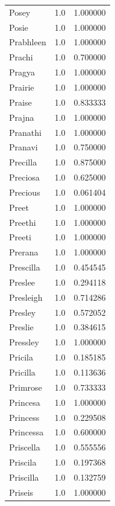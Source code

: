 \documentclass[
  letterpaper,
  DIV=11,
  numbers=noendperiod]{scrreprt}
\begin{document}
\begin{tabular}{lrr}
Posey           &   1.0 &   1.000000 \\
Posie           &   1.0 &   1.000000 \\
Prabhleen       &   1.0 &   1.000000 \\
Prachi          &   1.0 &   0.700000 \\
Pragya          &   1.0 &   1.000000 \\
Prairie         &   1.0 &   1.000000 \\
Praise          &   1.0 &   0.833333 \\
Prajna          &   1.0 &   1.000000 \\
Pranathi        &   1.0 &   1.000000 \\
Pranavi         &   1.0 &   0.750000 \\
Precilla        &   1.0 &   0.875000 \\
Preciosa        &   1.0 &   0.625000 \\
Precious        &   1.0 &   0.061404 \\
Preet           &   1.0 &   1.000000 \\
Preethi         &   1.0 &   1.000000 \\
Preeti          &   1.0 &   1.000000 \\
Prerana         &   1.0 &   1.000000 \\
Prescilla       &   1.0 &   0.454545 \\
Preslee         &   1.0 &   0.294118 \\
Presleigh       &   1.0 &   0.714286 \\
Presley         &   1.0 &   0.572052 \\
Preslie         &   1.0 &   0.384615 \\
Pressley        &   1.0 &   1.000000 \\
Pricila         &   1.0 &   0.185185 \\
Pricilla        &   1.0 &   0.113636 \\
Primrose        &   1.0 &   0.733333 \\
Princesa        &   1.0 &   1.000000 \\
Princess        &   1.0 &   0.229508 \\
Princessa       &   1.0 &   0.600000 \\
Priscella       &   1.0 &   0.555556 \\
Priscila        &   1.0 &   0.197368 \\
Priscilla       &   1.0 &   0.132759 \\
Priseis         &   1.0 &   1.000000 \\

\end{tabular}
\end{document}
